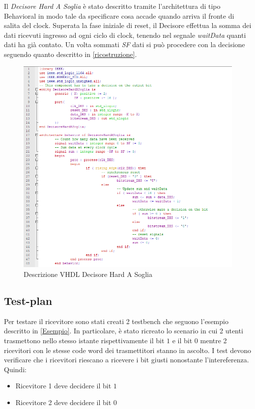\documentclass[a4paper,12pt]{article}
\begin{document}
    Il \textit{Decisore Hard A Soglia} è stato descritto tramite l'architettura di tipo Behavioral in modo tale da 
    specificare cosa accade quando arriva il fronte di salita del clock. Superata la fase iniziale di reset, il Decisore
    effettua la somma dei dati ricevuti ingresso ad ogni ciclo di clock, tenendo nel segnale \textit{waitData} quanti dati
    ha già contato. Un volta sommati \textit{SF} dati si può procedere con la decisione seguendo quanto descritto in 
    \ref{ricostruzione}.
    \begin{figure}[H]
      \centering
      \includegraphics[width=\textwidth]{img/DecisoreHardASoglia.png}
      \caption{Descrizione VHDL Decisore Hard A Soglia}
      \label{fig:vhdl:DHS}
    \end{figure}  

  \subsection{Test-plan}
    Per testare il ricevitore sono stati creati 2 testbench che seguono l'esempio descritto in \ref{Esempio}. In particolare,
    è stato ricreato lo scenario in cui 2 utenti trasmettono nello stesso istante rispettivamente il bit $1$ e il bit $0$ 
    mentre 2 ricevitori con le stesse code word dei trasmettitori stanno in ascolto.
    I test devono verificare che i ricevitori riescano a ricevere i bit giusti nonostante l'intereferenza. Quindi:
    \begin{itemize}
      \item Ricevitore 1 deve decidere il bit $1$
      \item Ricevitore 2 deve decidere il bit $0$
    \end{itemize}
\end{document}
